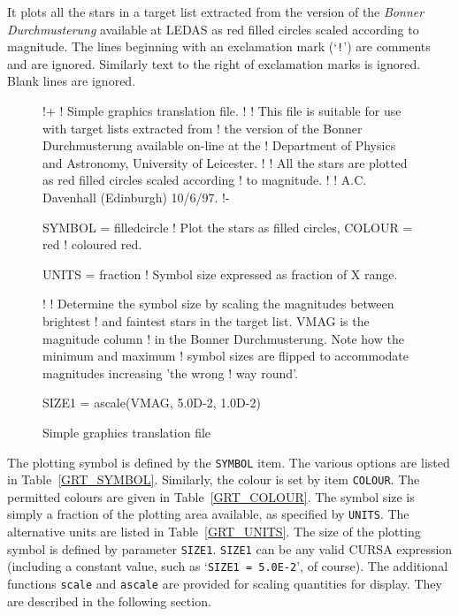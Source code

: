 \documentclass[twoside,11pt]{starlink}
\begin{document}
It plots all the stars in a target list extracted from the version of
the \textit{Bonner Durchmusterung}\/ available at LEDAS as red filled circles
scaled according to magnitude.  The lines beginning with an exclamation mark
(`\texttt{!}') are comments and are ignored.  Similarly text to the right
of exclamation marks is ignored.  Blank lines are ignored.

\begin{figure}[htbp]

\begin{terminalv}
!+
! Simple graphics translation file.
!
! This file is suitable for use with target lists extracted from
! the version of the Bonner Durchmusterung available on-line at the
! Department of Physics and Astronomy, University of Leicester.
!
! All the stars are plotted as red filled circles scaled according
! to magnitude.
!
! A.C. Davenhall (Edinburgh) 10/6/97.
!-

SYMBOL = filledcircle   ! Plot the stars as filled circles,
COLOUR = red            ! coloured red.

UNITS  = fraction       ! Symbol size expressed as fraction of X range.

!
! Determine the symbol size by scaling the magnitudes between brightest
! and faintest stars in the target list.  VMAG is the magnitude column
! in the Bonner Durchmusterung.  Note how the minimum and maximum
! symbol sizes are flipped to accommodate magnitudes increasing 'the wrong
! way round'.

SIZE1  =  ascale(VMAG, 5.0D-2, 1.0D-2)
\end{terminalv}

\caption{Simple graphics translation file \label{GRAPHTRAN} }

\end{figure}

The plotting symbol is defined by the \texttt{SYMBOL} item.  The various
options are listed in Table~\ref{GRT_SYMBOL}.  Similarly, the colour
is set by item \texttt{COLOUR}.  The permitted colours are given in
Table~\ref{GRT_COLOUR}.  The symbol size is simply a fraction of the
plotting area available, as specified by \texttt{UNITS}.  The alternative
units are listed in Table~\ref{GRT_UNITS}.  The size of the plotting
symbol is defined by parameter \texttt{SIZE1}.  \texttt{SIZE1} can be any
valid CURSA expression (including a constant value, such as `\texttt{SIZE1~=~5.0E-2}', of course).  The additional functions \texttt{scale}
and \texttt{ascale} are provided for scaling quantities for display. They
are described in the following section.
\end{document}
